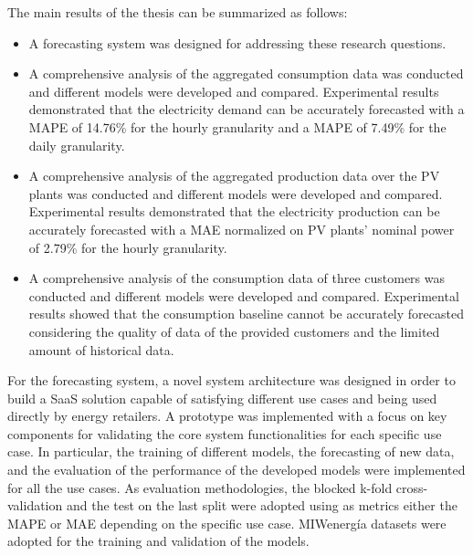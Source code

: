 The main results of the thesis can be summarized as follows:
\begin{itemize}
  \item A forecasting system was designed for addressing these research questions.
  \item A comprehensive analysis of the aggregated consumption data was conducted and different models were developed and compared. Experimental results demonstrated that the electricity demand can be accurately forecasted with a MAPE of 14.76\% for the hourly granularity and a MAPE of 7.49\% for the daily granularity.
  \item A comprehensive analysis of the aggregated production data over the PV plants was conducted and different models were developed and compared. Experimental results demonstrated that the electricity production can be accurately forecasted with a MAE normalized on PV plants' nominal power of 2.79\% for the hourly granularity.
  \item A comprehensive analysis of the consumption data of three customers was conducted and different models were developed and compared. Experimental results showed that the consumption baseline cannot be accurately forecasted considering the quality of data of the provided customers and the limited amount of historical data.
\end{itemize}

For the forecasting system, a novel system architecture was designed in order to build a SaaS solution capable of satisfying different use cases and being used directly by energy retailers.
A prototype was implemented with a focus on key components for validating the core system functionalities for each specific use case.
In particular, the training of different models, the forecasting of new data, and the evaluation of the performance of the developed models were implemented for all the use cases.
As evaluation methodologies, the blocked k-fold cross-validation and the test on the last split were adopted using as metrics either the MAPE or MAE depending on the specific use case.
MIWenergía datasets were adopted for the training and validation of the models.

